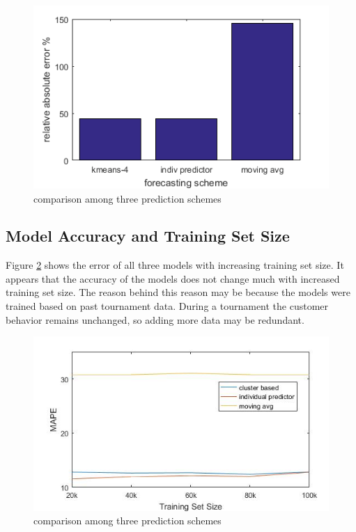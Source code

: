 \begin{figure}[h!]
\centering
\begin{minipage}{.5\textwidth}
  \centering
  \includegraphics[width=\linewidth]{final-relative-abs-error.png}
  \caption{comparison among three prediction schemes}
  \label{fig:prediction-scheme-vs-error}
\end{minipage}
  
\end{figure}

\subsection{Model Accuracy and Training Set Size}
Figure \ref{fig:trainset-vs-error} shows the error of all three models with increasing training set size. It appears that the accuracy of the models does not change much with increased training set size. The reason behind this reason may be because the models were trained based on past tournament data. During a tournament the customer behavior remains unchanged, so adding more data may be redundant. 

\begin{figure}[h!]
  \centering
  \includegraphics[width=\linewidth]{error-change-training-size.jpg}
  \caption{comparison among three prediction schemes}
  \label{fig:trainset-vs-error}
\end{figure}